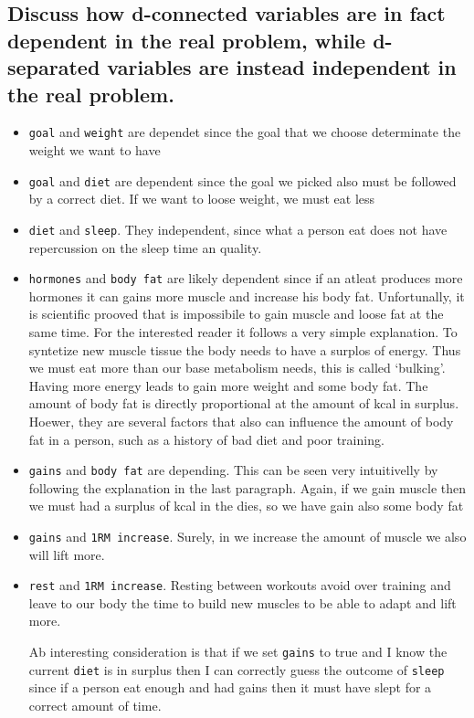 \documentclass[11pt]{article}
\begin{document}
\subsection{Discuss how d-connected variables are in fact dependent in the real problem, while d-separated variables are instead independent in the real problem.}

\begin{itemize}
\item
  \texttt{goal} and \texttt{weight} are dependet since the goal that we
  choose determinate the weight we want to have
\item
  \texttt{goal} and \texttt{diet} are dependent since the goal we picked
  also must be followed by a correct diet. If we want to loose weight,
  we must eat less
\item
  \texttt{diet} and \texttt{sleep}. They independent, since what a
  person eat does not have repercussion on the sleep time an quality.
\item
  \texttt{hormones} and \texttt{body\ fat} are likely dependent since if
  an atleat produces more hormones it can gains more muscle and increase
  his body fat. Unfortunally, it is scientific prooved that is
  impossibile to gain muscle and loose fat at the same time. For the
  interested reader it follows a very simple explanation. To syntetize
  new muscle tissue the body needs to have a surplos of energy. Thus we
  must eat more than our base metabolism needs, this is called
  `bulking'. Having more energy leads to gain more weight and some body
  fat. The amount of body fat is directly proportional at the amount of
  kcal in surplus. Hoewer, they are several factors that also can
  influence the amount of body fat in a person, such as a history of bad
  diet and poor training.
\item
  \texttt{gains} and \texttt{body\ fat} are depending. This can be seen
  very intuitivelly by following the explanation in the last paragraph.
  Again, if we gain muscle then we must had a surplus of kcal in the
  dies, so we have gain also some body fat
\item
  \texttt{gains} and \texttt{1RM\ increase}. Surely, in we increase the
  amount of muscle we also will lift more.
\item
  \texttt{rest} and \texttt{1RM\ increase}. Resting between workouts
  avoid over training and leave to our body the time to build new
  muscles to be able to adapt and lift more.

  Ab interesting consideration is that if we set \texttt{gains} to true
  and I know the current \texttt{diet} is in surplus then I can
  correctly guess the outcome of \texttt{sleep} since if a person eat
  enough and had gains then it must have slept for a correct amount of
  time.
\end{itemize}
\end{document}
